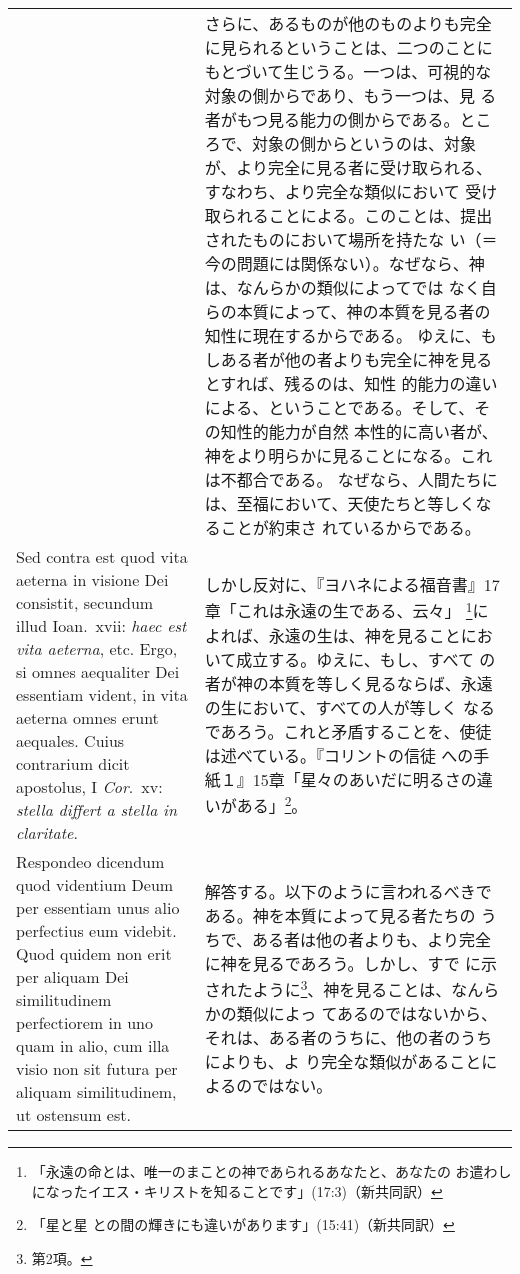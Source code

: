 \documentclass[10pt]{jsarticle} %
\begin{document}
\begin{longtable}{p{21em}p{21em}}
&

さらに、あるものが他のものよりも完全に見られるということは、二つのことに
もとづいて生じうる。一つは、可視的な対象の側からであり、もう一つは、見
る者がもつ見る能力の側からである。ところで、対象の側からというのは、対象
が、より完全に見る者に受け取られる、すなわち、より完全な類似において
受け取られることによる。このことは、提出されたものにおいて場所を持たな
い（＝今の問題には関係ない）。なぜなら、神は、なんらかの類似によってでは
なく自らの本質によって、神の本質を見る者の知性に現在するからである。
ゆえに、もしある者が他の者よりも完全に神を見るとすれば、残るのは、知性
的能力の違いによる、ということである。そして、その知性的能力が自然
本性的に高い者が、神をより明らかに見ることになる。これは不都合である。
なぜなら、人間たちには、至福において、天使たちと等しくなることが約束さ
れているからである。

\\

{\sc Sed contra est} quod vita aeterna in visione Dei consistit,
secundum illud Ioan.\ {\sc xvii}: {\it haec est vita aeterna},
etc. Ergo, si omnes aequaliter Dei essentiam vident, in vita aeterna
omnes erunt aequales. Cuius contrarium dicit apostolus, I {\it Cor}.\
{\sc xv}: {\it stella differt a stella in claritate}.

&

しかし反対に、『ヨハネによる福音書』17章「これは永遠の生である、云々」
\footnote{「永遠の命とは、唯一のまことの神であられるあなたと、あなたの
お遣わしになったイエス・キリストを知ることです」(17:3)（新共同訳）}に
よれば、永遠の生は、神を見ることにおいて成立する。ゆえに、もし、すべて
の者が神の本質を等しく見るならば、永遠の生において、すべての人が等しく
なるであろう。これと矛盾することを、使徒は述べている。『コリントの信徒
への手紙１』15章「星々のあいだに明るさの違いがある」\footnote{「星と星
との間の輝きにも違いがあります」(15:41)（新共同訳）}。

\\

{\sc Respondeo dicendum} quod videntium Deum per essentiam unus alio
perfectius eum videbit. Quod quidem non erit per aliquam Dei
similitudinem perfectiorem in uno quam in alio, cum illa visio non sit
futura per aliquam similitudinem, ut ostensum est. 

&

解答する。以下のように言われるべきである。神を本質によって見る者たちの
うちで、ある者は他の者よりも、より完全に神を見るであろう。しかし、すで
に示されたように\footnote{第2項。}、神を見ることは、なんらかの類似によっ
てあるのではないから、それは、ある者のうちに、他の者のうちによりも、よ
り完全な類似があることによるのではない。


\end{longtable}
\end{document}
